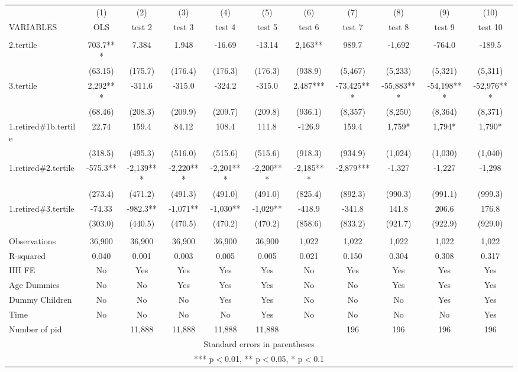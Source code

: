 \begin{tabular}{lcccccccccc} \hline
 & (1) & (2) & (3) & (4) & (5) & (6) & (7) & (8) & (9) & (10) \\
VARIABLES & OLS & test 2 & test 3 & test 4 & test 5 & test 6 & test 7 & test 8 & test 9 & test 10 \\ \hline
 &  &  &  &  &  &  &  &  &  &  \\
2.tertile & 703.7*** & 7.384 & 1.948 & -16.69 & -13.14 & 2,163** & 989.7 & -1,692 & -764.0 & -189.5 \\
 & (63.15) & (175.7) & (176.4) & (176.3) & (176.3) & (938.9) & (5,467) & (5,233) & (5,321) & (5,311) \\
3.tertile & 2,292*** & -311.6 & -315.0 & -324.2 & -315.0 & 2,487*** & -73,425*** & -55,883*** & -54,198*** & -52,976*** \\
 & (68.46) & (208.3) & (209.9) & (209.7) & (209.8) & (936.1) & (8,357) & (8,250) & (8,364) & (8,371) \\
1.retired\#1b.tertile & 22.74 & 159.4 & 84.12 & 108.4 & 111.8 & -126.9 & 159.4 & 1,759* & 1,794* & 1,790* \\
 & (318.5) & (495.3) & (516.0) & (515.6) & (515.6) & (918.3) & (934.9) & (1,024) & (1,030) & (1,040) \\
1.retired\#2.tertile & -575.3** & -2,139*** & -2,220*** & -2,201*** & -2,200*** & -2,185*** & -2,879*** & -1,327 & -1,227 & -1,298 \\
 & (273.4) & (471.2) & (491.3) & (491.0) & (491.0) & (825.4) & (892.3) & (990.3) & (991.1) & (999.3) \\
1.retired\#3.tertile & -74.33 & -982.3** & -1,071** & -1,030** & -1,029** & -418.9 & -341.8 & 141.8 & 206.6 & 176.8 \\
 & (303.0) & (440.5) & (470.5) & (470.2) & (470.2) & (858.6) & (833.2) & (921.7) & (922.9) & (929.0) \\
 &  &  &  &  &  &  &  &  &  &  \\
Observations & 36,900 & 36,900 & 36,900 & 36,900 & 36,900 & 1,022 & 1,022 & 1,022 & 1,022 & 1,022 \\
R-squared & 0.040 & 0.001 & 0.003 & 0.005 & 0.005 & 0.021 & 0.150 & 0.304 & 0.308 & 0.317 \\
HH FE & No & Yes & Yes & Yes & Yes & No & Yes & Yes & Yes & Yes \\
Age Dummies & No & No & Yes & Yes & Yes & No & No & Yes & Yes & Yes \\
Dummy Children & No & No & No & Yes & Yes & No & No & No & Yes & Yes \\
Time & No & No & No & No & Yes & No & No & No & No & Yes \\
 Number of pid &  & 11,888 & 11,888 & 11,888 & 11,888 &  & 196 & 196 & 196 & 196 \\ \hline
\multicolumn{11}{c}{ Standard errors in parentheses} \\
\multicolumn{11}{c}{ *** p$<$0.01, ** p$<$0.05, * p$<$0.1} \\
\end{tabular}
